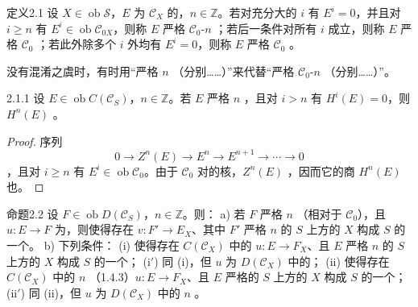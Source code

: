 \begin{SGAresult}{定义}{2.1}
设 $X\in\operatorname{ob}\mathscr S$，$E$ 为 $\mathscr C_X$ 的，$n\in\mathbb Z$。若对充分大的 $i$ 有 $E^i=0$，并且对 $i\geq n$ 有 $E^i\in\operatorname{ob}\mathscr C_{0X}$，则称 $E$ 严格 $\mathscr C_0$-$n$ ；若后一条件对所有 $i$ 成立，则称 $E$ 严格 $\mathscr C_0$ ；若此外除多个 $i$ 外均有 $E^i=0$，则称 $E$ 严格 $\mathscr C_0$ 。
\end{SGAresult}
没有混淆之虞时，有时用“严格 $n$ （分别……）”来代替“严格 $\mathscr C_0$-$n$ （分别……）”。
\begin{SGAresult}{}{2.1.1}
设 $E\in\operatorname{ob}C(\mathscr C_S)$，$n\in\mathbb Z$。若 $E$ 严格 $n$ ，且对 $i>n$ 有 $H^i(E)=0$，则 $H^n(E)$ 。
\end{SGAresult}
\begin{proof}
序列
\[0\longrightarrow Z^n(E)\longrightarrow E^n\longrightarrow E^{n+1}\longrightarrow\cdots\longrightarrow0\]
，且对 $i\geq n$ 有 $E^i\in\operatorname{ob}\mathscr C_0$。由于 $\mathscr C_0$ 对的核，$Z^n(E)$ ，因而它的商 $H^n(E)$ 也。
\end{proof}
\begin{SGAresult}{命题}{2.2}
设 $F\in\operatorname{ob}D(\mathscr C_S)$，$n\in\mathbb Z$。则：
a) 若 $F$ 严格 $n$ （相对于 $\mathscr C_0$），且 $u:E\to F$ 为，则使得存在 $v:F'\to E_X$、其中 $F'$ 严格 $n$ 的 $S$ 上方的 $X$ 构成 $S$ 的一个。
b) 下列条件：
(i) 使得存在 $C(\mathscr C_X)$ 中的 $u:E\to F_X$、且 $E$ 严格 $n$ 的 $S$ 上方的 $X$ 构成 $S$ 的一个；
(i$'$) 同 (i)，但 $u$ 为 $D(\mathscr C_X)$ 中的；
(ii) 使得存在 $C(\mathscr C_X)$ 中的 $n$ （1.4.3）$u:E\to F_X$、且 $E$ 严格的 $S$ 上方的 $X$ 构成 $S$ 的一个；
(ii$'$) 同 (ii)，但 $u$ 为 $D(\mathscr C_X)$ 中的 $n$ 。
\end{SGAresult}
